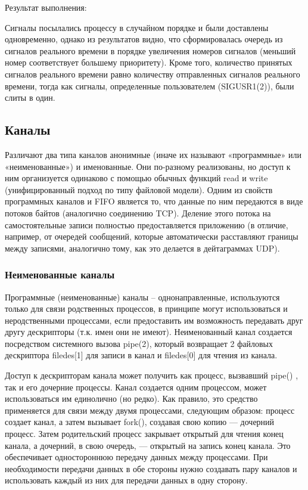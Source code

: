 \documentclass[a4paper]{article}
\begin{document}
	
	
	Результат выполнения:
	

	Сигналы посылались процессу в случайном порядке и были доставлены одновременно, однако из результатов видно, что сформировалась очередь из сигналов реального времени в порядке увеличения номеров сигналов (меньший номер соответствует большему приоритету).  Кроме того, количество принятых сигналов реального времени равно количеству отправленных сигналов реального времени, тогда как сигналы, определенные пользователем (SIGUSR1(2)), были слиты в один.
\subsection{Каналы}
	Различают два типа каналов анонимные (иначе их называют «программные» или «неименованные») и именованные. Они по-разному реализованы, но доступ к ним организуется одинаково с помощью обычных функций read и write (унифицированный подход по типу файловой модели). Одним из свойств программных каналов и FIFO является то, что данные по ним передаются в виде потоков байтов (аналогично соединению TCP). Деление этого потока на самостоятельные записи полностью предоставляется приложению (в отличие, например, от очередей сообщений, которые автоматически расставляют границы между записями, аналогично тому, как это делается в дейтаграммах UDP).
		
	\subsubsection{Неименованные каналы}
	Программные (неименованные) каналы – однонаправленные, используются только для связи родственных процессов, в принципе могут использоваться и неродственными процессами, если предоставить им возможность передавать друг другу дескрипторы (т.к. имен они не имеют). Неименованный канал создается посредством системного вызова pipe(2), который возвращает 2 файловых дескриптора filedes[1] для записи в канал и filedes[0] для чтения из канала.
	
	Доступ к дескрипторам канала может получить как процесс, вызвавший pipe() , так и его дочерние процессы. Канал создается одним процессом, может использоваться им единолично (но редко). Как правило, это средство применяется для связи между двумя процессами, следующим образом: процесс создает канал, а затем вызывает fork(), создавая свою копию — дочерний процесс. Затем родительский процесс закрывает открытый для чтения конец канала, а дочерний, в свою очередь, — открытый на запись конец канала. Это обеспечивает одностороннюю передачу данных между процессами. При необходимости передачи данных в обе стороны нужно создавать пару каналов и использовать каждый из них для передачи данных в одну сторону.
	
\end{document}
